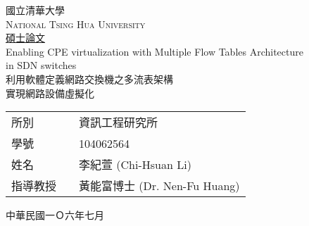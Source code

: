 \begin{center}
{\fontsize{32}{36}\selectfont 國立清華大學} \\
\large{\scshape National Tsing Hua University} \\
\vspace*{6ex}
\underline{\LARGE 碩士論文} \\

\null
\vfill
\Huge Enabling CPE virtualization with Multiple Flow Tables Architecture \\ in SDN switches \\
\vspace*{6ex}
\LARGE
利用軟體定義網路交換機之多流表架構 \\ 實現網路設備虛擬化

\null
\vfill

\large
\begin{tabular}{ll}
所別~~~     &資訊工程研究所                    \\[2ex]
學號~~~     &104062564                       \\[2ex]
姓名~~~     &李紀萱 (Chi-Hsuan Li)            \\[2ex]
指導教授~~  &黃能富博士 (Dr. Nen-Fu Huang)      \\[2ex]
\end{tabular}

\vspace*{6ex}
\Large 中華民國一Ｏ六年七月
\end{center}

\thispagestyle{empty}
\newpage
